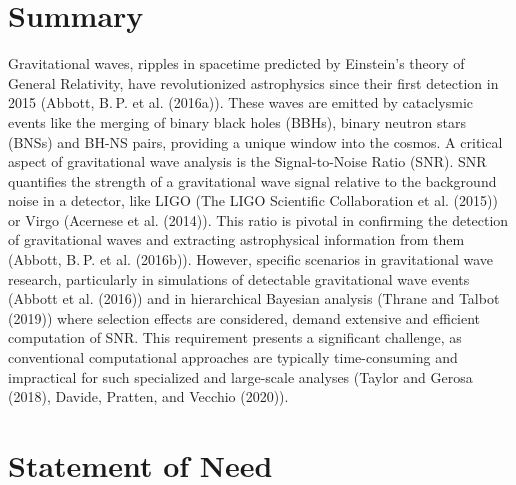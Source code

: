 \documentclass[10pt,a4paper,onecolumn]{article}
\begin{document}
\section{Summary}\label{summary}

Gravitational waves, ripples in spacetime predicted by Einstein's theory
of General Relativity, have revolutionized astrophysics since their
first detection in 2015 (Abbott, B. P. et al. (2016a)). These waves are
emitted by cataclysmic events like the merging of binary black holes
(BBHs), binary neutron stars (BNSs) and BH-NS pairs, providing a unique
window into the cosmos. A critical aspect of gravitational wave analysis
is the Signal-to-Noise Ratio (SNR). SNR quantifies the strength of a
gravitational wave signal relative to the background noise in a
detector, like LIGO (The LIGO Scientific Collaboration et al. (2015)) or
Virgo (Acernese et al. (2014)). This ratio is pivotal in confirming the
detection of gravitational waves and extracting astrophysical
information from them (Abbott, B. P. et al. (2016b)). However, specific
scenarios in gravitational wave research, particularly in simulations of
detectable gravitational wave events (Abbott et al. (2016)) and in
hierarchical Bayesian analysis (Thrane and Talbot (2019)) where
selection effects are considered, demand extensive and efficient
computation of SNR. This requirement presents a significant challenge,
as conventional computational approaches are typically time-consuming
and impractical for such specialized and large-scale analyses (Taylor
and Gerosa (2018), Davide, Pratten, and Vecchio (2020)).

\section{Statement of Need}\label{statement-of-need}
\end{document}
